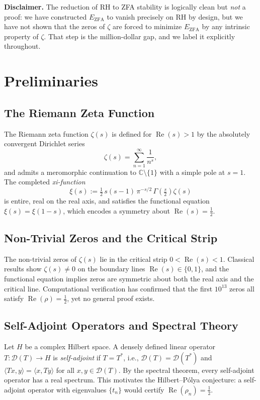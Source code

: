 \documentclass[12pt]{article}
\theoremstyle{definition}
\newcommand{\EZFA}{E_{\mathrm{ZFA}}}
\begin{document}
\medskip
\noindent\textbf{Disclaimer.}
The reduction of RH to ZFA stability is logically clean but
\emph{not} a proof: we have constructed $\EZFA$ to vanish precisely
on RH by design, but we have not shown that the zeros of $\zeta$
are forced to minimize $\EZFA$ by any intrinsic property of $\zeta$.
That step is the million-dollar gap, and we label it explicitly
throughout.

\section{Preliminaries}

\subsection{The Riemann Zeta Function}

The Riemann zeta function $\zeta(s)$ is defined for
$\operatorname{Re}(s) > 1$ by the absolutely convergent Dirichlet
series
\[
  \zeta(s) = \sum_{n=1}^{\infty} \frac{1}{n^s},
\]
and admits a meromorphic continuation to $\mathbb{C}\setminus\{1\}$
with a simple pole at $s = 1$.
The completed \emph{xi-function}
\[
  \xi(s)
  := \tfrac{1}{2}\,s(s-1)\,\pi^{-s/2}\,
     \Gamma\!\left(\tfrac{s}{2}\right)\zeta(s)
\]
is entire, real on the real axis, and satisfies the functional
equation $\xi(s) = \xi(1-s)$, which encodes a symmetry about
$\operatorname{Re}(s) = \tfrac{1}{2}$.

\subsection{Non-Trivial Zeros and the Critical Strip}

The non-trivial zeros of $\zeta(s)$ lie in the critical strip
$0 < \operatorname{Re}(s) < 1$.
Classical results show $\zeta(s) \neq 0$ on the boundary lines
$\operatorname{Re}(s) \in \{0, 1\}$, and the functional equation
implies zeros are symmetric about both the real axis and the critical
line.
Computational verification has confirmed that the first
$10^{13}$ zeros all satisfy $\operatorname{Re}(\rho) = \tfrac{1}{2}$,
yet no general proof exists.

\subsection{Self-Adjoint Operators and Spectral Theory}

Let $H$ be a complex Hilbert space.
A densely defined linear operator $T : \mathcal{D}(T) \to H$ is
\emph{self-adjoint} if $T = T^*$, i.e., $\mathcal{D}(T) = \mathcal{D}(T^*)$
and $\langle Tx, y\rangle = \langle x, Ty\rangle$ for all
$x, y \in \mathcal{D}(T)$.
By the spectral theorem, every self-adjoint operator has a real
spectrum.
This motivates the Hilbert--P\'olya conjecture: a self-adjoint
operator with eigenvalues $\{t_n\}$ would certify
$\operatorname{Re}(\rho_n) = \tfrac{1}{2}$.
\end{document}
